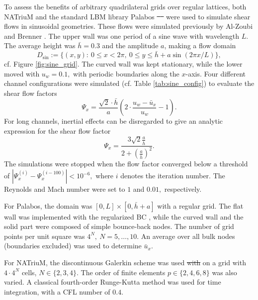 \documentclass[1p, sort&compress]{elsarticle}
\providecommand{\DIFaddtex}[1]{{\protect\color{blue}\uwave{#1}}} %
\providecommand{\DIFdeltex}[1]{{\protect\color{red}\sout{#1}}}                      %
\providecommand{\DIFaddbegin}{} %
\providecommand{\DIFaddend}{} %
\providecommand{\DIFdelbegin}{} %
\providecommand{\DIFdelend}{} %
\providecommand{\DIFadd}[1]{\texorpdfstring{\DIFaddtex{#1}}{#1}} %
\providecommand{\DIFdel}[1]{\texorpdfstring{\DIFdeltex{#1}}{}} %
\newcommand{\DIFscaledelfig}{0.5}
\newlength{\DIFdelgraphicswidth} %
\newlength{\DIFdelgraphicsheight} %
\newcommand{\DIFaddincludegraphics}[2][]{{\color{blue}\fbox{\DIFOincludegraphics[#1]{#2}}}} %
\newcommand{\DIFdelincludegraphics}[2][]{%
\sbox{\DIFdelgraphicsbox}{\DIFOincludegraphics[#1]{#2}}%
\settoboxwidth{\DIFdelgraphicswidth}{\DIFdelgraphicsbox} %
\settoboxtotalheight{\DIFdelgraphicsheight}{\DIFdelgraphicsbox} %
\scalebox{\DIFscaledelfig}{%
\parbox[b]{\DIFdelgraphicswidth}{\usebox{\DIFdelgraphicsbox}\\[-\baselineskip] \rule{\DIFdelgraphicswidth}{0em}}\llap{\resizebox{\DIFdelgraphicswidth}{\DIFdelgraphicsheight}{%
\setlength{\unitlength}{\DIFdelgraphicswidth}%
\begin{picture}(1,1)%
\thicklines\linethickness{2pt} %
{\color[rgb]{1,0,0}\put(0,0){\framebox(1,1){}}}%
{\color[rgb]{1,0,0}\put(0,0){\line( 1,1){1}}}%
{\color[rgb]{1,0,0}\put(0,1){\line(1,-1){1}}}%
\end{picture}%
}\hspace*{3pt}}} %
} %
\DeclareRobustCommand{\DIFaddbegin}{\DIFOaddbegin \let\includegraphics\DIFaddincludegraphics} %
\DeclareRobustCommand{\DIFaddend}{\DIFOaddend \let\includegraphics\DIFOincludegraphics} %
\DeclareRobustCommand{\DIFdelbegin}{\DIFOdelbegin \let\includegraphics\DIFdelincludegraphics} %
\DeclareRobustCommand{\DIFdelend}{\DIFOaddend \let\includegraphics\DIFOincludegraphics} %
\begin{document}
\DIFdelend To assess the benefits of arbitrary quadrilateral grids over regular lattices, both NATriuM and the standard LBM library Palabos \DIFdelbegin \DIFdel{\mbox{%
\cite{Palabos} }%
}\DIFdelend were used to simulate shear flows in sinusoidal geometries. These flows were simulated previously by Al-Zoubi and Brenner \cite{AlZoubi.2008}. The upper wall was one period of a sine wave with wavelength $L$. The average height was $\bar{h} = 0.3$ and the amplitude $a$, making a flow domain 
$$D_{\sin} := \{(x,y):\ 0 \leq x < 2\pi,\ 0 \leq y \leq \bar{h} + a\sin(2\pi x/L) \},$$ 
cf. Figure \ref{fig:sine_grid}.
The curved wall was kept stationary, while the lower moved with $u_w = 0.1,$ with periodic boundaries along the $x$-axis.
Four different channel configurations \DIFaddbegin \DIFadd{Conf. 1 - 4 }\DIFaddend were simulated (cf. Table \ref{tab:sine_config}) to evaluate the shear flow factors
\begin{equation*}
\Psi_{x} = \frac{ \sqrt{2}\cdot\bar{h}}{a} \left( 2 \cdot \frac{u_w - \bar{u}_x}{u_w} -1 \right).
\end{equation*}
For long channels, inertial effects can be disregarded to give an analytic expression for the shear flow factor \cite{Letalleur.2002}
\begin{equation*}
\Psi_{x} = \frac{3 \sqrt{2} \frac{a}{\bar{h}}}{2+\left( \frac{a}{\bar{h}} \right)^{2}}.
\end{equation*}
The simulations were stopped when the flow factor converged below a threshold of $| \Psi_{x}^{(i)}-\Psi_{x}^{(i-100)}| < 10^{-6},$ where $i$ denotes the iteration number. The Reynolds and Mach number were set to $1$ and $0.01,$ respectively. 

For Palabos, the domain was $[0,L] \times [0,\bar{h}+a]$ with a regular grid. The flat wall was implemented with the regularized BC \DIFaddbegin \DIFadd{\mbox{%
\cite{Latt.2008}}%
}\DIFaddend , while the curved wall and the solid part were composed of simple bounce-back nodes. The number of grid points per unit square was $4^N,\ N = 5, \dots ,10.$ An average over all bulk nodes (boundaries excluded) was used to determine $\bar{u}_x$.

For NATriuM, the discontinuous Galerkin scheme was used \DIFdelbegin \DIFdel{with }\DIFdelend on a grid with $4\cdot 4^N$ cells, $N \in \{2,3,4\}.$ The order of finite elements $p \in \{2,4,6,8\}$ was also varied. A classical fourth-order Runge-Kutta method was used for time integration, with a CFL number of $0.4.$ 
\end{document}
